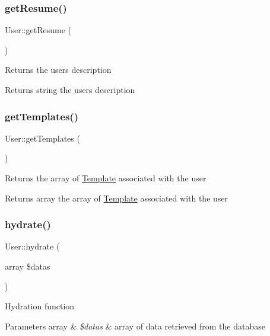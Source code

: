 \subsubsection{\texorpdfstring{get\+Resume()}{getResume()}}
{\footnotesize\ttfamily User\+::get\+Resume (\begin{DoxyParamCaption}{ }\end{DoxyParamCaption})}

Returns the user\textquotesingle{}s description \begin{DoxyReturn}{Returns}
string the user\textquotesingle{}s description 
\end{DoxyReturn}
\mbox{\label{classUser_a9840344fcf0330ef04b97828230c467a}} 
\subsubsection{\texorpdfstring{get\+Templates()}{getTemplates()}}
{\footnotesize\ttfamily User\+::get\+Templates (\begin{DoxyParamCaption}{ }\end{DoxyParamCaption})}

Returns the array of \hyperlink{classTemplate}{Template} associated with the user \begin{DoxyReturn}{Returns}
array the array of \hyperlink{classTemplate}{Template} associated with the user 
\end{DoxyReturn}
\mbox{\label{classUser_a3380b9274ee3d0eab7a522dd237ad34f}} 
\subsubsection{\texorpdfstring{hydrate()}{hydrate()}}
{\footnotesize\ttfamily User\+::hydrate (\begin{DoxyParamCaption}\item[{array}]{\$datas }\end{DoxyParamCaption})\hspace{0.3cm}{\ttfamily [protected]}}

Hydration function 
\begin{DoxyParams}[1]{Parameters}
array & {\em \$datas} & array of data retrieved from the database \\
\hline
\end{DoxyParams}
\mbox{\label{classUser_a844421f74da565923b63bb44f387e495}} 
